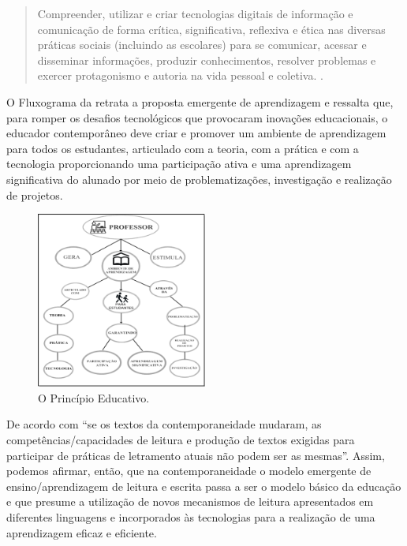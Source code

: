 \documentclass{textolivre}
\begin{document}
\begin{quote}
    Compreender, utilizar e criar tecnologias digitais de informação e comunicação de forma crítica, significativa, reflexiva e ética nas diversas práticas sociais (incluindo as escolares) para se comunicar, acessar e disseminar informações, produzir conhecimentos, resolver problemas e exercer protagonismo e autoria na vida pessoal e coletiva. \cite{brasil_base_2017}.
\end{quote}

O Fluxograma da  retrata a proposta emergente de aprendizagem e ressalta que, para romper os desafios tecnológicos que provocaram inovações educacionais, o educador contemporâneo deve criar e promover um ambiente de aprendizagem para todos os estudantes, articulado com a teoria, com a prática e com a tecnologia proporcionando uma participação ativa e uma aprendizagem significativa do alunado por meio de problematizações, investigação e realização de projetos. 

\begin{figure}[htbp]
 \centering
 \includegraphics[width=0.5\textwidth]{Fig01.png}
 \caption{O Princípio Educativo.}
 \label{Fig01}
\end{figure}

De acordo com \textcite[p. 8]{rojo_multiletramentos_2012} “se os textos da contemporaneidade mudaram, as competências/capacidades de leitura e produção de textos exigidas para participar de práticas de letramento atuais não podem ser as mesmas”. Assim, podemos afirmar, então, que na contemporaneidade o modelo emergente de ensino/aprendizagem de leitura e escrita passa a ser o modelo básico da educação e que presume a utilização de novos mecanismos de leitura apresentados em diferentes linguagens e incorporados às tecnologias para a realização de uma aprendizagem eficaz e eficiente.  
\end{document}
